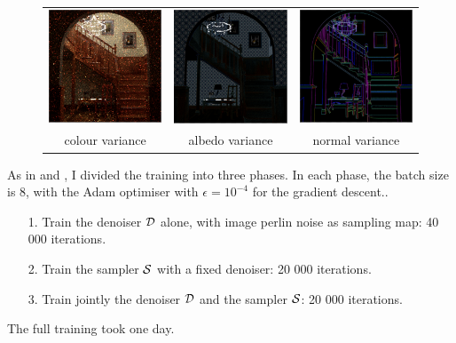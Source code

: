 \documentclass{classeENS}
\begin{document}
\begin{figure}[H]
    \centering
    \begin{tabular}{ccc}
    \includegraphics[width=45mm]{image/networkInput/colorV.png}
    & \includegraphics[width=45mm]{image/networkInput/albedoV.png}
    & \includegraphics[width=45mm]{image/networkInput/normalV.png} \\
    colour variance & albedo variance & normal variance
\end{tabular}
\end{figure}

As in \cite{kuznetsov2018deep} and \cite{10.1145/3550454.3555515}, I divided the training
into three phases. In each phase, the batch size is 8, with the Adam optimiser \cite{kingma2017adam}
with $\epsilon = 10^{-4}$ for the gradient descent..
\begin{itemize}
    \item[1.] Train the denoiser $\mathcal D$ alone, with image perlin noise as sampling map: 
                40 000 iterations.
    \item[2.] Train the sampler $\mathcal S$ with a fixed denoiser: 20 000 iterations.
    \item[3.] Train jointly the denoiser $\mathcal D$ and the sampler $\mathcal S$: 20 000 iterations.
\end{itemize}
The full training took one day.
\end{document}
